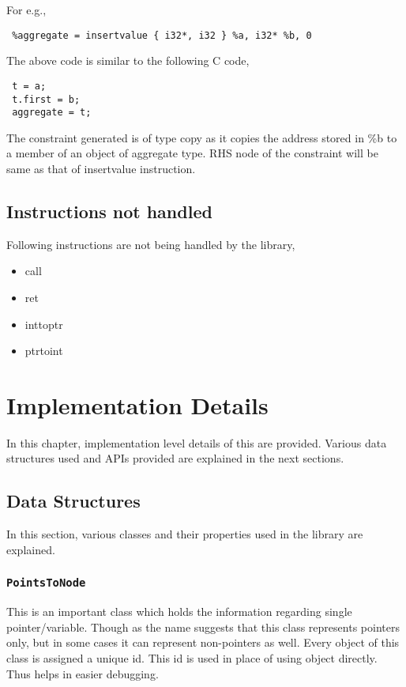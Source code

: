 \documentclass[a4paper,11pt]{report}
\begin{document}
For e.g.,

\begin{lstlisting}
 %aggregate = insertvalue { i32*, i32 } %a, i32* %b, 0
\end{lstlisting}

The above code is similar to the following C code,

\begin{lstlisting}
 t = a;
 t.first = b;
 aggregate = t;
\end{lstlisting}

The constraint generated is of type copy as it copies the address stored in \%b 
to a member of an object of aggregate type. RHS node of the constraint will be 
same as that of insertvalue instruction.

\section{Instructions not handled}
Following instructions are not being handled by the library,

\begin{itemize}
    \item call
    \item ret
    \item inttoptr
    \item ptrtoint
\end{itemize}

\chapter{Implementation Details}
In this chapter, implementation level details of this are provided. Various 
data structures used and APIs provided are explained in the next sections.

\section{Data Structures}
In this section, various classes and their properties used in the library are 
explained.

\subsection{\texttt{PointsToNode}}
This is an important class which holds the information regarding single 
pointer/variable. Though as the name suggests that this class represents 
pointers only, but in some cases it can represent non-pointers as well.
Every object of this class is assigned a unique id. This id is used in place 
of using object directly. Thus helps in easier debugging.
\end{document}
